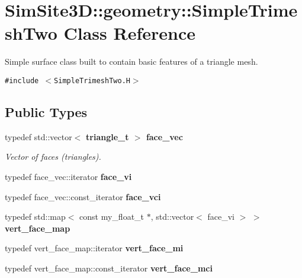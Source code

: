 \section{SimSite3D::geometry::Simple\-Trimesh\-Two Class Reference}
\label{classSimSite3D_1_1geometry_1_1SimpleTrimeshTwo}
Simple surface class built to contain basic features of a triangle mesh.  


{\tt \#include $<$Simple\-Trimesh\-Two.H$>$}

\subsection*{Public Types}
\begin{CompactItemize}
\item 
typedef std::vector$<$ \bf{triangle\_\-t} $>$ \bf{face\_\-vec}\label{classSimSite3D_1_1geometry_1_1SimpleTrimeshTwo_ec05b95a341017a23bdde9bf620ebd9d}

\begin{CompactList}\small\item\em Vector of faces (triangles). \item\end{CompactList}\item 
typedef face\_\-vec::iterator \textbf{face\_\-vi}\label{classSimSite3D_1_1geometry_1_1SimpleTrimeshTwo_9f9179ecbefd0b14eb5b29e70bb525fd}

\item 
typedef face\_\-vec::const\_\-iterator \textbf{face\_\-vci}\label{classSimSite3D_1_1geometry_1_1SimpleTrimeshTwo_c9438f49aea92dbb9ad4f32ba5e032e5}

\item 
typedef std::map$<$ const my\_\-float\_\-t $\ast$, std::vector$<$ face\_\-vi $>$ $>$ \textbf{vert\_\-face\_\-map}\label{classSimSite3D_1_1geometry_1_1SimpleTrimeshTwo_3af2a848c69967b35e02a7f3a7f5b93e}

\item 
typedef vert\_\-face\_\-map::iterator \textbf{vert\_\-face\_\-mi}\label{classSimSite3D_1_1geometry_1_1SimpleTrimeshTwo_a582b60e306ca9d1cd1c26c4e93f27a0}

\item 
typedef vert\_\-face\_\-map::const\_\-iterator \textbf{vert\_\-face\_\-mci}\label{classSimSite3D_1_1geometry_1_1SimpleTrimeshTwo_e129ee7a79ee1a610e15d68f0b04f559}

\end{CompactItemize}
